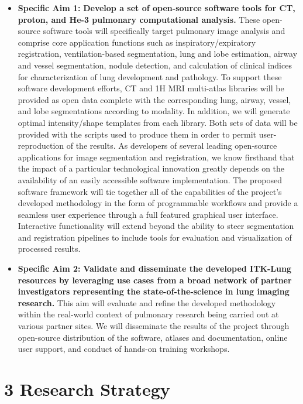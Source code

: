 \documentclass[11pt,]{article}
\begin{document}
\begin{itemize}
\itemsep1pt\parskip0pt
\item
  \textbf{Specific Aim 1:} \textbf{Develop a set of open-source software
  tools for CT, proton, and He-3 pulmonary computational analysis.}
  These open-source software tools will specifically target pulmonary
  image analysis and comprise core application functions such as
  inspiratory/expiratory registration, ventilation-based segmentation,
  lung and lobe estimation, airway and vessel segmentation, nodule
  detection, and calculation of clinical indices for characterization of
  lung development and pathology. To support these software development
  efforts, CT and 1H MRI multi-atlas libraries will be provided as open
  data complete with the corresponding lung, airway, vessel, and lobe
  segmentations according to modality. In addition, we will generate
  optimal intensity/shape templates from each library. Both sets of data
  will be provided with the scripts used to produce them in order to
  permit user-reproduction of the results. As developers of several
  leading open-source applications for image segmentation and
  registration, we know firsthand that the impact of a particular
  technological innovation greatly depends on the availability of an
  easily accessible software implementation. The proposed software
  framework will tie together all of the capabilities of the project's
  developed methodology in the form of programmable workflows and
  provide a seamless user experience through a full featured graphical
  user interface. Interactive functionality will extend beyond the
  ability to steer segmentation and registration pipelines to include
  tools for evaluation and visualization of processed results.
\item
  \textbf{Specific Aim 2:} \textbf{Validate and disseminate the
  developed ITK-Lung resources by leveraging use cases from a broad
  network of partner investigators representing the state-of-the-science
  in lung imaging research.} This aim will evaluate and refine the
  developed methodology within the real-world context of pulmonary
  research being carried out at various partner sites. We will
  disseminate the results of the project through open-source
  distribution of the software, atlases and documentation, online user
  support, and conduct of hands-on training workshops.
\end{itemize}

\newpage

\section{3 Research Strategy}\label{research-strategy}
\end{document}
